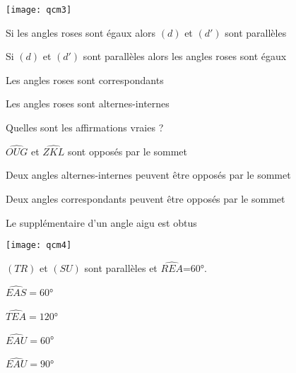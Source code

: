 \begin{QCM}
\begin{GroupeQCM}
\begin{exercice}
\begin{center}
    \texttt{[image: qcm3]}
\end{center}
\begin{ChoixQCM}{4}
\item Si les angles roses sont égaux alors $(d)$ et $(d')$ sont parallèles
\item Si $(d)$ et $(d')$ sont parallèles alors les angles roses sont égaux
\item Les angles roses sont correspondants
\item Les angles roses sont alternes-internes
\end{ChoixQCM}
\begin{corrige}
\end{corrige}
\end{exercice}


\begin{exercice}
Quelles sont les affirmations vraies ?
\begin{ChoixQCM}{4}
\item $\widehat{OUG}$ et $\widehat{ZKL}$ sont opposés par le sommet
\item Deux angles alternes-internes peuvent être opposés par le sommet
\item Deux angles correspondants peuvent être opposés par le sommet
\item Le supplémentaire d'un angle aigu est obtus
\end{ChoixQCM}
\begin{corrige}
\end{corrige}
\end{exercice}




\begin{exercice}
\begin{center}
    \texttt{[image: qcm4]}
    
    $(TR)$ et $(SU)$ sont parallèles et $\widehat{REA}$=60°.
\end{center}
\begin{ChoixQCM}{4}
\item $\widehat{EAS}=60$°
\item $\widehat{TEA}=120$°
\item $\widehat{EAU}=60$°
\item $\widehat{EAU}=90$°
\end{ChoixQCM}
\begin{corrige}
\end{corrige}
\end{exercice}

\end{GroupeQCM}
\end{QCM}